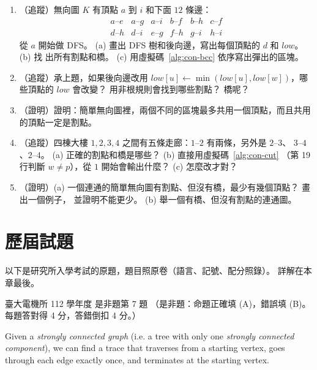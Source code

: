 \begin{enumerate}
\item \label{q:con-cut-k}（追蹤）無向圖 $K$ 有頂點 $a$ 到 $i$ 和下面 $12$ 條邊：
\[
\begin{array}{llllll}
a\text{--}e & a\text{--}g & a\text{--}i & b\text{--}f & b\text{--}h & c\text{--}f \\
d\text{--}h & d\text{--}i & e\text{--}g & f\text{--}h & g\text{--}i & h\text{--}i
\end{array}
\]
從 $a$ 開始做 DFS。 (a) 畫出 DFS 樹和後向邊，寫出每個頂點的 $d$ 和 $\mathit{low}$。 (b) 找
出所有割點和橋。 (c) 用虛擬碼~\ref{alg:con-bcc} 依序寫出彈出的區塊。

\item （追蹤）承上題，如果後向邊改用 $\mathit{low}[u] \gets \min(\mathit{low}[u],
\mathit{low}[w])$，哪些頂點的 $\mathit{low}$ 會改變？ 用非根規則會找到哪些割點？ 橋呢？

\item \label{q:con-block-share}（證明）證明：簡單無向圖裡，兩個不同的區塊最多共用一個頂點，而且共用的頂點一定是割點。

\item （追蹤）四棟大樓 $1, 2, 3, 4$ 之間有五條走廊：$1$--$2$ 有兩條，另外是 $2$--$3$、
$3$--$4$、$2$--$4$。 (a) 正確的割點和橋是哪些？ (b) 直接用虛擬碼~\ref{alg:con-cut}
（第 19 行判斷 $w \ne p$），從 $1$ 開始會輸出什麼？ (c) 怎麼改才對？

\item （證明）(a) 一個連通的簡單無向圖有割點、但沒有橋，最少有幾個頂點？ 畫出一個例子，
並證明不能更少。 (b) 舉一個有橋、但沒有割點的連通圖。
\end{enumerate}

\section{歷屆試題}
\label{sec:con-pastexam}

以下是研究所入學考試的原題，題目照原卷（語言、記號、配分照錄）。 詳解在本章最後。

\begin{pastexam}[label={px:con-1}]{臺大電機所 112 學年度 是非題第 7 題}
（是非題：命題正確填 (A)，錯誤填 (B)。 每題答對得 4 分，答錯倒扣 4 分。）

Given a \textit{strongly connected graph} (i.e. a tree with only one \textit{strongly connected component}), we can find a trace that traverses from a starting vertex, goes through each edge exactly once, and terminates at the starting vertex.
\end{pastexam}

